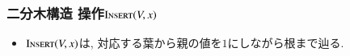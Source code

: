 \documentclass[main]{subfiles}
\begin{document}
\begin{frame}\frametitle{二分木構造 操作$\mathrm{\text{I\textsc{nsert}}}(V,x)$}
\begin{itemize}
\item $\mathrm{\text{I\textsc{nsert}}}(V,x)$は, 対応する葉から親の値を$1$にしながら根まで辿る.
\end{itemize}
 

\end{frame}
\end{document}
